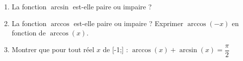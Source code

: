 
\begin{exercice}\label{exostarterST-0012}

  
  \begin{enumerate}
  \item La fonction $\arcsin$ est-elle paire ou impaire ? 
  \item La fonction $\arccos$ est-elle paire ou impaire ? Exprimer $\arccos(-x)$ en fonction de $\arccos(x)$. 
  \item Montrer que pour tout réel $x$ de [-1\;;] :  $\arccos(x) + \arcsin (x) = \dfrac{ \pi}{2}$ 
    \end{enumerate}

\end{exercice}

